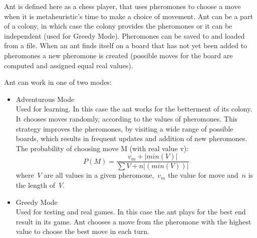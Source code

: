 \documentclass[pdftex]{article}
\begin{document}
Ant is defined here as a chess player, that uses pheromones to choose a move when it is metaheuristic's time to make a choice of movement. Ant can be a part of a colony, in which case the colony provides the pheromones or it can be independent (used for Greedy Mode). Pheromones can be saved to and loaded from a file. When an ant finds itself on a board that has not yet been added to pheromones a new pheromone is created (possible moves for the board are computed and assigned equal real values).

 Ant can work in one of two modes: 
\begin{itemize}
 	\item Adventurous Mode \hfill \\
		Used for learning. In this case the ant works for the betterment of its colony. It chooses moves randomly, according to the values of pheromones. This strategy improves the pheromones, by visiting a wide range of possible boards, which results in frequent updates and addition of new pheromones. The probability of choosing move M (with real value v):
\begin{equation}
\label{eq:choosingequation}
	P(M) = \frac{v_m + |min(V)|}{\sum V + n|(min(V))|}
\end{equation}
where~$V$ are all values in a given pheromone,~$v_m$ the value for move and~$n$ is the length of~$V$.

	\item Greedy Mode \hfill \\
		Used for testing and real games. In this case the ant plays for the best end result in its game. Ant chooses a move from the pheromone with the highest value to choose the best move in each turn.
\end{itemize}
\end{document}
